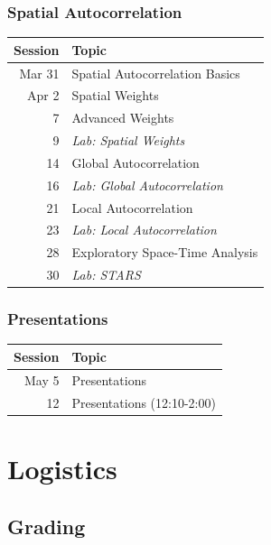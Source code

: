 \documentclass[nototal,handout]{beamer}
\begin{document}
\begin{frame}
	\frametitle{Spatial Autocorrelation}
  \begin{center}
  \begin{tabular}{|rl|}
  \hline
  Session&Topic\\
  \hline
  Mar 31&Spatial Autocorrelation Basics\\
  Apr 2&Spatial Weights\\
  7&Advanced  Weights\\
  9&\emph{Lab: Spatial Weights}\\
  14&Global Autocorrelation\\
  16&\emph{Lab: Global Autocorrelation}\\
  21&Local Autocorrelation\\
  23&\emph{Lab: Local Autocorrelation}\\
  28&Exploratory Space-Time Analysis \\
  30&\emph{Lab: STARS}\\
  \hline
  \end{tabular}
  \end{center}
 \end{frame} 

\begin{frame}
	\frametitle{Presentations}
  \begin{center}
  \begin{tabular}{|rl|}
  \hline
  Session&Topic\\
  \hline
  May 5&Presentations\\
  12&Presentations (12:10-2:00)\\
  \hline
  \end{tabular}
  \end{center}
 \end{frame} 


\section{Logistics} 

\subsection{Grading} 
\end{document}
